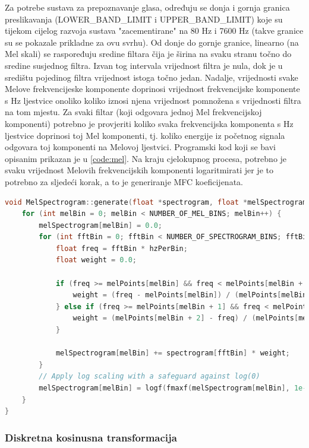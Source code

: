 Za potrebe sustava za prepoznavanje glasa, određuju se donja i gornja granica preslikavanja 
(LOWER\_BAND\_LIMIT i UPPER\_BAND\_LIMIT) koje su tijekom cijelog razvoja sustava "zacementirane"
na 80 Hz i 7600 Hz (takve granice su se pokazale prikladne za ovu svrhu). Od donje do gornje
granice, linearno (na Mel skali) se raspoređuju sredine filtara čija je širina na svaku stranu 
točno do sredine susjednog filtra. Izvan tog intervala vrijednost filtra je nula, dok je u središtu
pojedinog filtra vrijednost istoga točno jedan. Nadalje, vrijednosti svake Melove frekvencijeske
komponente doprinosi vrijednost frekvencijske komponente s Hz ljestvice onoliko koliko iznosi
njena vrijednost pomnožena s vrijednosti filtra na tom mjestu. Za svaki filtar (koji odgovara
jednoj Mel frekvencijskoj komponenti) potrebno je provjeriti koliko svaka frekvencijska komponenta 
s Hz ljestvice doprinosi toj Mel komponenti, tj. koliko energije iz početnog signala
odgovara toj komponenti na Melovoj ljestvici. Programski kod koji se bavi opisanim prikazan je u 
\ref{code:mel}. Na kraju cjelokupnog procesa, potrebno je svaku vrijednost Melovih frekvencijskih
komponenti logaritmirati jer je to potrebno za sljedeći korak, a to je generiranje MFC koeficijenata.

\begin{lstlisting}[language=C++, caption=FFT, label=code:mel]
void MelSpectrogram::generate(float *spectrogram, float *melSpectrogram){
    for (int melBin = 0; melBin < NUMBER_OF_MEL_BINS; melBin++) {
        melSpectrogram[melBin] = 0.0;
        for (int fftBin = 0; fftBin < NUMBER_OF_SPECTROGRAM_BINS; fftBin++){
            float freq = fftBin * hzPerBin;
            float weight = 0.0;

            if (freq >= melPoints[melBin] && freq < melPoints[melBin + 1]){
                weight = (freq - melPoints[melBin]) / (melPoints[melBin + 1] - melPoints[melBin]);
            } else if (freq >= melPoints[melBin + 1] && freq < melPoints[melBin + 2]){
                weight = (melPoints[melBin + 2] - freq) / (melPoints[melBin + 2] - melPoints[melBin + 1]);
            }

            melSpectrogram[melBin] += spectrogram[fftBin] * weight;
        }
        // Apply log scaling with a safeguard against log(0)
        melSpectrogram[melBin] = logf(fmaxf(melSpectrogram[melBin], 1e-6));
    }
}
\end{lstlisting}

\subsubsection{Diskretna kosinusna transformacija}

